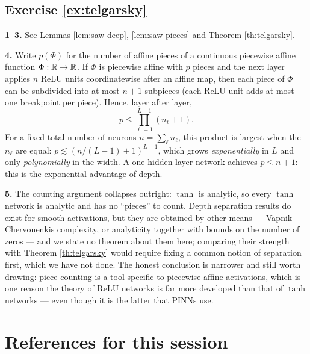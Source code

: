 \documentclass[11pt,a4paper]{article}
\begin{document}
\subsection*{Exercise \ref{ex:telgarsky}}

\textbf{1--3.} See Lemmas \ref{lem:saw-deep}, \ref{lem:saw-pieces} and Theorem
\ref{th:telgarsky}.

\textbf{4.} Write $p(\Phi)$ for the number of affine pieces of a continuous piecewise affine
function $\Phi : \mathbb{R} \to \mathbb{R}$. If $\Phi$ is piecewise affine with $p$ pieces and the next layer
applies $n$ ReLU units coordinatewise after an affine map, then each piece of $\Phi$ can be
subdivided into at most $n+1$ subpieces (each ReLU unit adds at most one breakpoint per piece).
Hence, layer after layer,
\[
p \le \prod_{\ell=1}^{L-1}(n_\ell + 1).
\]
For a fixed total number of neurons $n = \sum_\ell n_\ell$, this product is largest when the
$n_\ell$ are equal: $p \lesssim (n/(L-1) + 1)^{L-1}$, which grows \emph{exponentially} in $L$ and
only \emph{polynomially} in the width. A one-hidden-layer network achieves $p \le n+1$: this is the
exponential advantage of depth.

\textbf{5.} The counting argument collapses outright: $\tanh$ is analytic, so every $\tanh$ network
is analytic and has no ``pieces'' to count. Depth separation results do exist for smooth
activations, but they are obtained by other means --- Vapnik--Chervonenkis complexity, or
analyticity together with bounds on the number of zeros --- and we state no theorem about them here;
comparing their strength with Theorem \ref{th:telgarsky} would require fixing a common notion of
separation first, which we have not done. The honest conclusion is narrower and still worth drawing:
piece-counting is a tool specific to piecewise affine activations, which is one reason the theory of
ReLU networks is far more developed than that of $\tanh$ networks --- even though it is the latter
that PINNs use.

\newpage
\fi

\section*{References for this session}
\end{document}
